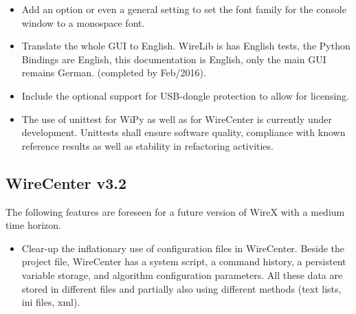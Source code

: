 \documentclass[11pt,a4paper,onepage,openany]{book}
\begin{document}
\begin{itemize}
\item Add an option or even a general setting to set the font family for the
    console window to a monospace font.

\item Translate the whole GUI to English. WireLib is has English tests, the
    Python Bindings are English, this documentation is English, only the main
    GUI remains German. (completed by Feb/2016).

\item Include the optional support for USB-dongle protection to allow for
    licensing.

\item The use of unittest for WiPy as well as for WireCenter is currently under
    development. Unittests shall ensure software quality, compliance with known
    reference results as well as stability in refactoring activities.
\end{itemize}

\subsection{WireCenter v3.2}
The following features are foreseen for a future version of WireX with a medium
time horizon.
\begin{itemize}
\item Clear-up the inflationary use of configuration files in WireCenter.
    Beside the project file, WireCenter has a system script, a command
    history, a persistent variable storage, and algorithm configuration
    parameters. All these data are stored in different files and partially
    also using different methods (text lists, ini files, xml).

\end{itemize}
\end{document}
